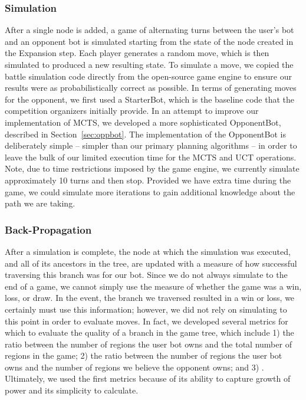 \documentclass[a4paper,11pt]{article}
\begin{document}
\subsubsection{Simulation}
After a single node is added, a game of alternating turns between the user's bot and an 
opponent bot is simulated starting from the state of the node created in the Expansion step.  
Each player generates a random move, which is then simulated to produced a new resulting state.
To simulate a move, we copied the battle simulation code directly from the open-source game engine
to ensure our results were as probabilistically correct as possible. In terms of generating moves
for the opponent, we first used a StarterBot, which is the baseline code that the competition 
organizers initially provide.  In an attempt to improve our implementation of MCTS, we developed 
a more sophisticated OpponentBot, described in Section~\ref{sec:oppbot}.  The implementation of the
OpponentBot is deliberately simple -- simpler than our primary planning algorithms -- in order to 
leave the bulk of our limited execution time for the MCTS and UCT operations.  Note, due to time 
restrictions imposed by the game engine, we currently simulate approximately 10 turns and then stop.  
Provided we have extra time during the game, we could simulate more iterations to gain additional
 knowledge about the path we are taking.

\subsubsection{Back-Propagation}
After a simulation is complete, the node at which the simulation was executed, and all of its 
ancestors in the tree, are updated with a measure of how successful traversing this branch was 
for our bot. Since we do not always simulate to the end of a game, we cannot simply use the measure
of whether the game was a win, loss, or draw.  In the event, the branch we traversed resulted in a win
or loss, we certainly must use this information; however, we did not rely on simulating to this point
in order to evaluate moves. In fact, we developed several metrics for which to evaluate
the quality of a branch in the game tree, which include 1) the ratio between the number of regions
the user bot owns and the total number of regions in the game; 2) the ratio between the number of 
regions the user bot owns  and the number of regions we believe the opponent owns; and 
3) . 
Ultimately, we used the first metrics because of its ability to capture growth of power and 
its simplicity to calculate.  
\end{document}
